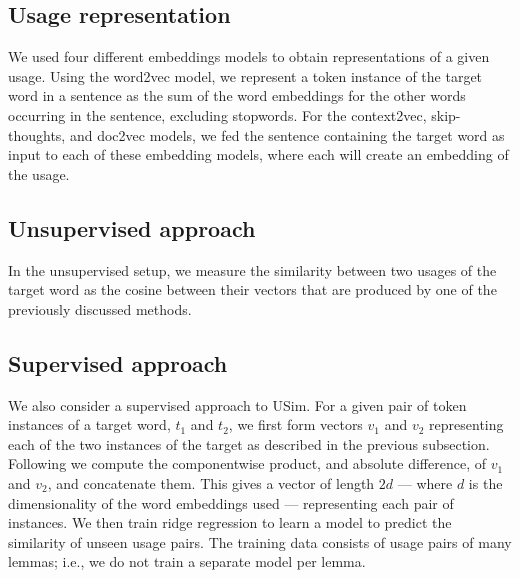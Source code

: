 \documentclass[11pt]{article}
\begin{document}
\subsection{Usage representation}
We used four different embeddings models to obtain representations of a given usage. Using the word2vec model, we represent a token instance of the target word in a sentence as the
sum of the word embeddings for the other words occurring in the
sentence, excluding stopwords. For the context2vec, skip-thoughts, and doc2vec models, we fed the sentence containing the target word as input to each of these embedding models, where each will create an embedding of the usage. 

\subsection{Unsupervised approach}


In the unsupervised setup, we measure the similarity between two usages of the target word
as the cosine between their vectors that are produced by one of the previously discussed methods. 



\subsection{Supervised approach}

We also consider a supervised approach to USim. For a given pair of
token instances of a target word, $t_1$ and $t_2$, we first form
vectors $v_1$ and $v_2$ representing each of the two instances of the
target as described in the previous subsection. Following
\cite{Tai+:2015} we compute the componentwise product, and absolute
difference, of $v_1$ and $v_2$, and concatenate them. This gives a
vector of length $2d$ --- where $d$ is the dimensionality of the word
embeddings used --- representing each pair of instances. We then train
ridge regression to learn a model to predict the similarity of unseen
usage pairs. The training data consists of usage pairs of many lemmas;
i.e., we do not train a separate  model per lemma.

\end{document}
